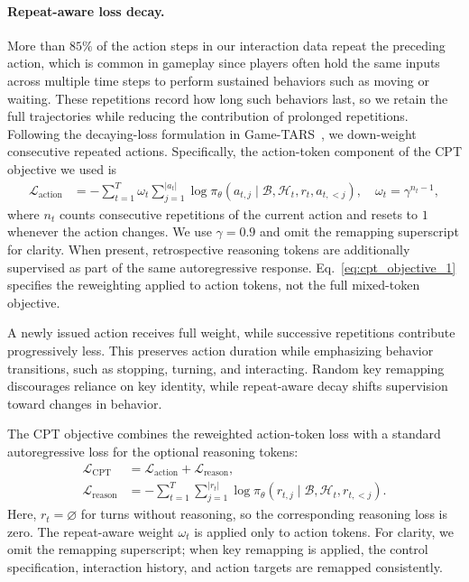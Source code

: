 \paragraph{Repeat-aware loss decay.}
More than $85\%$ of the action steps in our interaction data repeat the preceding action, which is common in gameplay since players often hold the same inputs across multiple time steps to perform sustained behaviors such as moving or waiting. These repetitions record how long such behaviors last, so we retain the full trajectories while reducing the contribution of prolonged repetitions. Following the decaying-loss formulation in Game-TARS~\cite{wang2025gametars}, we down-weight consecutive repeated actions. Specifically, the action-token component of the CPT objective we used is
\begin{equation}
\begin{aligned}
\mathcal{L}_{\mathrm{action}}
    &=-\sum_{t=1}^{T}\omega_t
      \sum_{j=1}^{|a_t|}
      \log\pi_\theta(a_{t,j}\mid\mathcal{B},\mathcal{H}_t,r_t,a_{t,<j}),\quad
\omega_t=\gamma^{n_t-1},
\end{aligned}
\label{eq:cpt_objective_1}
\end{equation}
where $n_t$ counts consecutive repetitions of the current action and resets to $1$ whenever the action changes. We use $\gamma=0.9$ and omit the remapping superscript for clarity. When present, retrospective reasoning tokens are additionally supervised as part of the same autoregressive response. Eq.~\eqref{eq:cpt_objective_1} specifies the reweighting applied to action tokens, not the full mixed-token objective.

A newly issued action receives full weight, while successive repetitions contribute progressively less. This preserves action duration while emphasizing behavior transitions, such as stopping, turning, and interacting. Random key remapping discourages reliance on key identity, while repeat-aware decay shifts supervision toward changes in behavior.

The CPT objective combines the reweighted action-token loss with a standard autoregressive loss for the optional reasoning tokens:
\begin{equation}
\begin{aligned}
\mathcal{L}_{\mathrm{CPT}}
&=\mathcal{L}_{\mathrm{action}}+\mathcal{L}_{\mathrm{reason}},\\
\mathcal{L}_{\mathrm{reason}}
&=-\sum_{t=1}^{T}
\sum_{j=1}^{|r_t|}
\log\pi_\theta(r_{t,j}\mid\mathcal{B},\mathcal{H}_t,r_{t,<j}).
\end{aligned}
\label{eq:cpt_objective}
\end{equation}
Here, $r_t=\varnothing$ for turns without reasoning, so the corresponding reasoning loss is zero. The repeat-aware weight $\omega_t$ is applied only to action tokens. For clarity, we omit the remapping superscript; when key remapping is applied, the control specification, interaction history, and action targets are remapped consistently.

